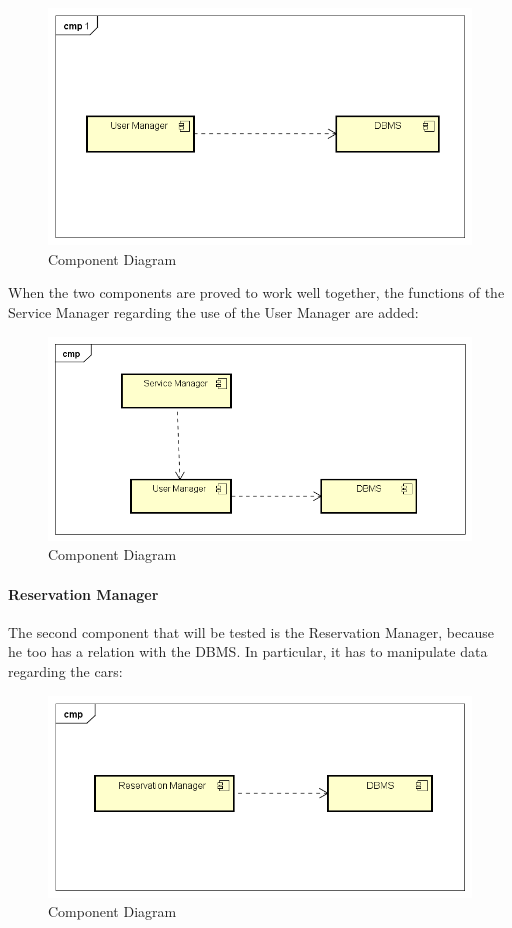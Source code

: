 \begin{figure}[H]	
	\centering
	\includegraphics[width=\textwidth]{img/UserMan_DBMS_int}
	\caption{Component Diagram}
\end{figure}
\noindent
When the two components are proved to work well together, the functions of the Service Manager regarding the use of the User Manager are added: 

\begin{figure}[H]	
	\centering
	\includegraphics[width=\textwidth]{img/UserMan_SrvMan_int}
	\caption{Component Diagram}
\end{figure}
\paragraph{Reservation Manager}
The second component that will be tested is the Reservation Manager, because he too has a relation with the DBMS. In particular, it has to manipulate data regarding the cars:

\begin{figure}[H]	
	\centering
	\includegraphics[width=\textwidth]{img/ResMan_DBMS_int}
	\caption{Component Diagram}
\end{figure}

